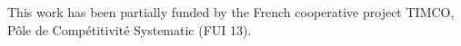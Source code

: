 This work has been partially funded by the French cooperative project T\+I\+M\+C\+O, Pôle de Compétitivité Systematic (F\+U\+I 13). 